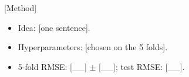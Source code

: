 
\begin{frame}{[Method]}
  \begin{itemize}
    \item Idea: [one sentence].
    \item Hyperparameters: [chosen on the 5 folds].
    \item 5-fold RMSE: [\_\_] $\pm$ [\_\_]; test RMSE: [\_\_].
  \end{itemize}
\end{frame}
